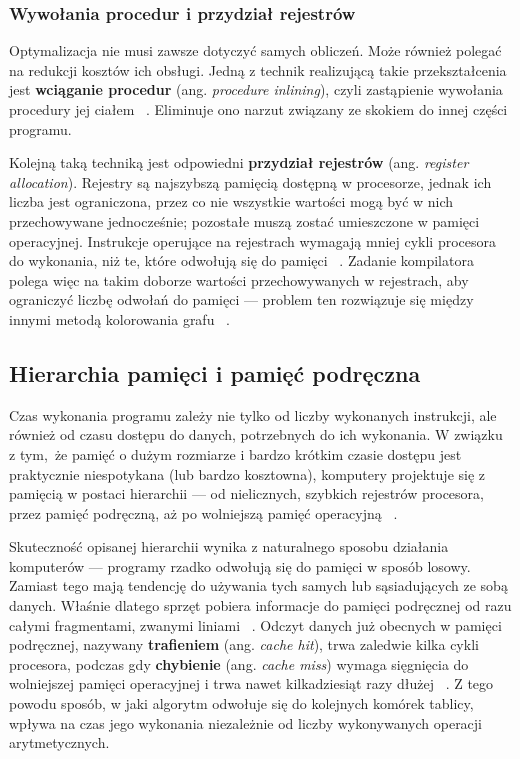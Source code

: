 \subsubsection{Wywołania procedur i przydział rejestrów}

Optymalizacja nie musi zawsze dotyczyć samych obliczeń. Może również polegać na redukcji kosztów ich obsługi. Jedną z technik realizującą takie przekształcenia jest \textbf{wciąganie procedur} (ang. \textit{procedure inlining}), czyli zastąpienie wywołania procedury jej ciałem ~\cite{Kompilatory_Aho}. Eliminuje ono narzut związany ze skokiem do innej części programu.

Kolejną taką techniką jest odpowiedni \textbf{przydział rejestrów} (ang. \textit{register allocation}). Rejestry są najszybszą pamięcią dostępną w procesorze, jednak ich liczba jest ograniczona, przez co nie wszystkie wartości mogą być w nich przechowywane jednocześnie; pozostałe muszą zostać umieszczone w pamięci operacyjnej. Instrukcje operujące na rejestrach wymagają mniej cykli procesora do wykonania, niż te, które odwołują się do pamięci ~\cite{Kompilatory_Aho}. Zadanie kompilatora polega więc na takim doborze wartości przechowywanych w rejestrach, aby ograniczyć liczbę odwołań do pamięci — problem ten rozwiązuje się między innymi metodą kolorowania grafu ~\cite{Kompilatory_Aho}.

\subsection{Hierarchia pamięci i pamięć podręczna}


Czas wykonania programu zależy nie tylko od liczby wykonanych instrukcji, ale również od czasu dostępu do danych, potrzebnych do ich wykonania. W związku z tym, że pamięć o dużym rozmiarze i bardzo krótkim czasie dostępu jest praktycznie niespotykana (lub bardzo kosztowna), komputery projektuje się z pamięcią w postaci hierarchii — od nielicznych, szybkich rejestrów procesora, przez pamięć podręczną, aż po wolniejszą pamięć operacyjną ~\cite{Kompilatory_Aho}.

Skuteczność opisanej hierarchii wynika z naturalnego sposobu działania komputerów — programy rzadko odwołują się do pamięci w sposób losowy. Zamiast tego mają tendencję do  używania tych samych lub sąsiadujących ze sobą danych. Właśnie dlatego sprzęt pobiera informacje do pamięci podręcznej od razu całymi fragmentami, zwanymi liniami ~\cite{Kompilatory_Aho}. Odczyt danych już obecnych w pamięci podręcznej, nazywany \textbf{trafieniem} (ang. \textit{cache hit}), trwa zaledwie kilka cykli procesora, podczas gdy \textbf{chybienie} (ang. \textit{cache miss}) wymaga sięgnięcia do wolniejszej pamięci operacyjnej i trwa nawet kilkadziesiąt razy dłużej ~\cite{Kompilatory_Aho}. Z tego powodu sposób, w jaki algorytm odwołuje się do kolejnych komórek tablicy, wpływa na czas jego wykonania niezależnie od liczby wykonywanych operacji arytmetycznych.

